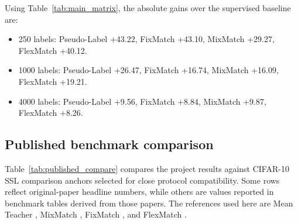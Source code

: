 Using Table~\ref{tab:main_matrix}, the absolute gains over the supervised baseline are:

\begin{itemize}
    \item 250 labels: Pseudo-Label +43.22, FixMatch +43.10, MixMatch +29.27, FlexMatch +40.12.
    \item 1000 labels: Pseudo-Label +26.47, FixMatch +16.74, MixMatch +16.09, FlexMatch +19.21.
    \item 4000 labels: Pseudo-Label +9.56, FixMatch +8.84, MixMatch +9.87, FlexMatch +8.26.
\end{itemize}

\subsection{Published benchmark comparison}

Table~\ref{tab:published_compare} compares the project results against CIFAR-10 SSL comparison anchors selected for close protocol compatibility. Some rows reflect original-paper headline numbers, while others are values reported in benchmark tables derived from those papers. The references used here are Mean Teacher \cite{Reference3}, MixMatch \cite{Reference4}, FixMatch \cite{Reference5}, and FlexMatch \cite{Reference7}.

